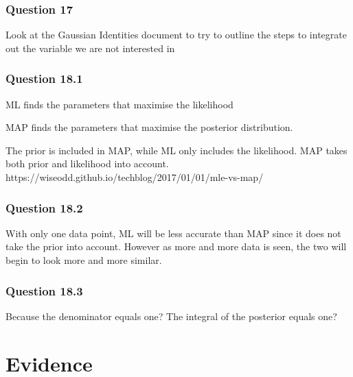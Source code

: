 \documentclass[10pt, a4paper, twocolumn]{article} %
\begin{document}
\subsubsection*{Question 17}

Look at the Gaussian Identities document to try to outline the steps to integrate out the variable we are not interested in

\subsubsection*{Question 18.1}

ML finds the parameters that maximise the likelihood

MAP finds the parameters that maximise the posterior distribution.

The prior is included in MAP, while ML only includes the likelihood. MAP takes both prior and likelihood into account.
https://wiseodd.github.io/techblog/2017/01/01/mle-vs-map/

\subsubsection*{Question 18.2}

With only one data point, ML will be less accurate than MAP since it does not take the prior into account. However as more and more data is seen, the two will begin to look more and more similar.

\subsubsection*{Question 18.3}

Because the denominator equals one? The integral of the posterior equals one?

\section{Evidence}


\printbibliography[title={Bibliography}] %

\end{document}
